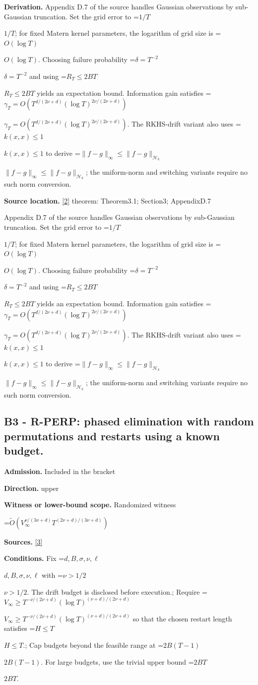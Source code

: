 \documentclass[10pt,a4paper]{article}
\newcommand{\AtlasMath}[1]{\par\begingroup\centering\setbox0=\hbox{$\displaystyle #1$}\ifdim\wd0>1.4\linewidth\typeout{ATLAS WIDE FORMULA: \the\wd0}\fi\ifdim\wd0>\linewidth\resizebox{\linewidth}{!}{\box0}\else\box0\fi\par\endgroup}
\newcommand{\AtlasInlineMath}[1]{\begingroup\setbox0=\hbox{$#1$}\ifdim\wd0>.4\linewidth\endgroup\AtlasMath{#1}\else\endgroup$#1$\fi}
\begin{document}
\textbf{Derivation.} Appendix D.7 of the source handles Gaussian observations by sub-Gaussian truncation. Set the grid error to \AtlasInlineMath{1/T}; for fixed Matern kernel parameters, the logarithm of grid size is \AtlasInlineMath{O(\log T)}. Choosing failure probability \AtlasInlineMath{\delta=T^{-2}} and using \AtlasInlineMath{R_T\le2BT} yields an expectation bound. Information gain satisfies \AtlasInlineMath{\gamma_T=O(T^{d/(2\nu+d)}(\log T)^{2\nu/(2\nu+d)})}. The RKHS-drift variant also uses \AtlasInlineMath{k(x,x)\le1} to derive \AtlasInlineMath{\|f-g\|_\infty\le\|f-g\|_{\mathcal H_k}}; the uniform-norm and switching variants require no such norm conversion.

\textbf{Source location.} \href{https://proceedings.mlr.press/v206/hong23b.html}{[2]} theorem: Theorem3.1; Section3; AppendixD.7

Appendix D.7 of the source handles Gaussian observations by sub-Gaussian truncation. Set the grid error to \AtlasInlineMath{1/T}; for fixed Matern kernel parameters, the logarithm of grid size is \AtlasInlineMath{O(\log T)}. Choosing failure probability \AtlasInlineMath{\delta=T^{-2}} and using \AtlasInlineMath{R_T\le2BT} yields an expectation bound. Information gain satisfies \AtlasInlineMath{\gamma_T=O(T^{d/(2\nu+d)}(\log T)^{2\nu/(2\nu+d)})}. The RKHS-drift variant also uses \AtlasInlineMath{k(x,x)\le1} to derive \AtlasInlineMath{\|f-g\|_\infty\le\|f-g\|_{\mathcal H_k}}; the uniform-norm and switching variants require no such norm conversion.

\subsection{B3 - R-PERP: phased elimination with random permutations and restarts using a known budget.}
\textbf{Admission.} Included in the bracket

\textbf{Direction.} upper

\textbf{Witness or lower-bound scope.} Randomized witness

\AtlasMath{\widetilde{O}\!\left(V_\infty^{\nu/(3\nu+d)}T^{(2\nu+d)/(3\nu+d)}\right)}
\textbf{Sources.} \href{https://proceedings.mlr.press/v258/iwazaki25a.html}{[3]}

\textbf{Conditions.} Fix \AtlasInlineMath{d,B,\sigma,\nu,\ell} with \AtlasInlineMath{\nu>1/2}. The drift budget is disclosed before execution.; Require \AtlasInlineMath{V_\infty\ge T^{-\nu/(2\nu+d)}(\log T)^{(\nu+d)/(2\nu+d)}} so that the chosen restart length satisfies \AtlasInlineMath{H\le T}.; Cap budgets beyond the feasible range at \AtlasInlineMath{2B(T-1)}. For large budgets, use the trivial upper bound \AtlasInlineMath{2BT}.
\end{document}
